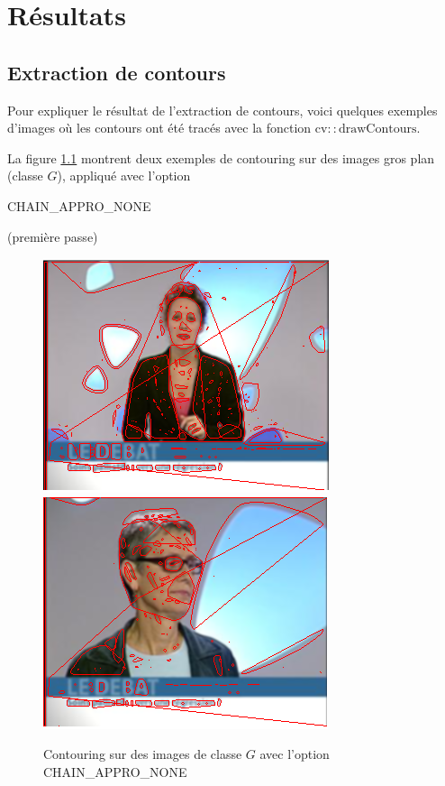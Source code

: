\documentclass{book}
\begin{document}
\chapter{Résultats}
\section{Extraction de contours}
Pour expliquer le résultat de l’extraction de contours, voici quelques exemples d'images où les contours ont été tracés avec 
la fonction $\mathrm{cv::drawContours}$.

La figure \ref{contouringG1} montrent deux exemples de contouring sur des images \og gros plan \fg{} (classe $G$), appliqué
avec l'option \begin{itshape}CHAIN\_APPRO\_NONE\end{itshape} (première passe)

\begin{figure}[H]
\begin{center}
\includegraphics[scale=0.5]{contouring_exemple1_classeG_passe1.png}
\includegraphics[scale=0.5]{contouring_exemple2_classeG_passe1.png}
\end{center}
\caption{Contouring sur des images de classe $G$ avec l'option CHAIN\_APPRO\_NONE}
\label{contouringG1}
\end{figure}
\end{document}
